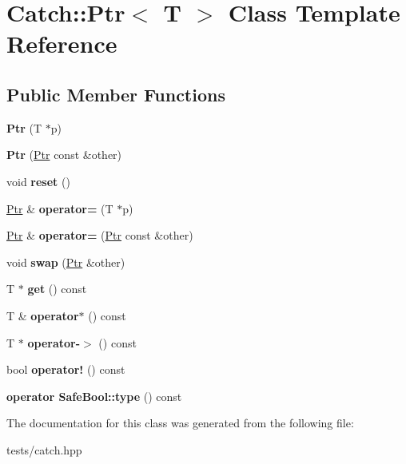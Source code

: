 \hypertarget{class_catch_1_1_ptr}{}\section{Catch\+:\+:Ptr$<$ T $>$ Class Template Reference}
\label{class_catch_1_1_ptr}
\subsection*{Public Member Functions}
\begin{DoxyCompactItemize}
\item 
\mbox{\label{class_catch_1_1_ptr_aacec063a79cd142e39040a31c6b3c40b}} 
{\bfseries Ptr} (T $\ast$p)
\item 
\mbox{\label{class_catch_1_1_ptr_ac629dd8ebe5763a37bb89e6c1d6a1771}} 
{\bfseries Ptr} (\hyperlink{class_catch_1_1_ptr}{Ptr} const \&other)
\item 
\mbox{\label{class_catch_1_1_ptr_af8d0fa7a2cd20842830b354ac31dfe5c}} 
void {\bfseries reset} ()
\item 
\mbox{\label{class_catch_1_1_ptr_a9b08c868b447d679ed201921f5c94683}} 
\hyperlink{class_catch_1_1_ptr}{Ptr} \& {\bfseries operator=} (T $\ast$p)
\item 
\mbox{\label{class_catch_1_1_ptr_af42074444c1bc6a70ebdc406a8617708}} 
\hyperlink{class_catch_1_1_ptr}{Ptr} \& {\bfseries operator=} (\hyperlink{class_catch_1_1_ptr}{Ptr} const \&other)
\item 
\mbox{\label{class_catch_1_1_ptr_a172bf8b4e71e26a5a4d92f5b02158b50}} 
void {\bfseries swap} (\hyperlink{class_catch_1_1_ptr}{Ptr} \&other)
\item 
\mbox{\label{class_catch_1_1_ptr_a2158bb2a1a21b001a2e72d4591d3e31e}} 
T $\ast$ {\bfseries get} () const
\item 
\mbox{\label{class_catch_1_1_ptr_a8d73989b1c77a1cab6152766feaa837f}} 
T \& {\bfseries operator$\ast$} () const
\item 
\mbox{\label{class_catch_1_1_ptr_acc0996cbd99f360069260a898b3f4fda}} 
T $\ast$ {\bfseries operator-\/$>$} () const
\item 
\mbox{\label{class_catch_1_1_ptr_a85c4fe6cebf2a69d0416020b65714360}} 
bool {\bfseries operator!} () const
\item 
\mbox{\label{class_catch_1_1_ptr_a102838cb25643586679e12efca26a3af}} 
{\bfseries operator Safe\+Bool\+::type} () const
\end{DoxyCompactItemize}


The documentation for this class was generated from the following file\+:\begin{DoxyCompactItemize}
\item 
tests/catch.\+hpp\end{DoxyCompactItemize}
